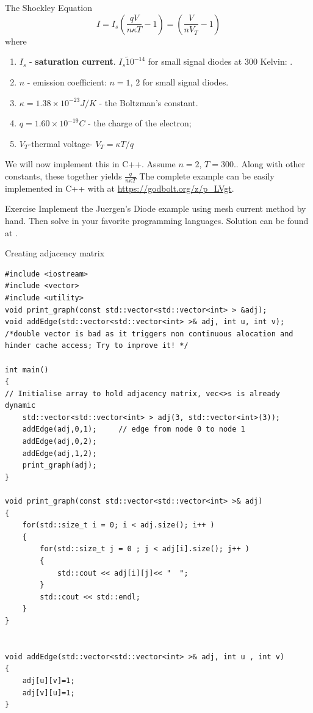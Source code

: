 \documentclass[xcolor=dvipsnames]{beamer}
\begin{document}
\begin{frame}{The Shockley Equation}
\[I=I_s\left(\frac{qV}{n\kappa T}-1\right)=\left(\frac{V}{nV_T}-1\right)\]
where
\begin{enumerate}
    \item $I_s$ - \textbf{saturation current}. $I_s\tilde 10^{-14}$ for small signal diodes at $300$ Kelvin: .
    \item $n$ - emission coefficient: $n=1,\,2$ for small signal diodes.
    \item $\kappa=1.38\times 10^{-23} J/K$ - the Boltzman's constant.
    \item $q=1.60\times 10^{-19}C$ - the charge of the electron;
    \item $V_T$-thermal voltage- $V_T=\kappa T/q$
\end{enumerate}
We will now implement this in C++. Assume $n=2$, $T=300.$. Along with other constants, these together yields $\frac{q}{n\kappa T}$ The complete example can be easily implemented in C++ with  \href{http://eigen.tuxfamily.org/index.php?title=Main_Page}{}
at \url{https://godbolt.org/z/p_LVgt}.

\end{frame}

\begin{frame}{Exercise}
	Implement the Juergen's Diode example using mesh current method by hand. Then solve in your favorite programming languages.
	Solution can be found at \href{https://github.com/leannejdong/Lachine-Est/blob/master/latex/soln-diode.pdf}{}.
\end{frame}

\begin{frame}[fragile,shrink=5]{Creating adjacency matrix}
\begin{verbatim}
#include <iostream>
#include <vector>
#include <utility>
void print_graph(const std::vector<std::vector<int> > &adj);
void addEdge(std::vector<std::vector<int> >& adj, int u, int v); 
/*double vector is bad as it triggers non continuous alocation and 
hinder cache access; Try to improve it! */

int main()
{
// Initialise array to hold adjacency matrix, vec<>s is already dynamic
    std::vector<std::vector<int> > adj(3, std::vector<int>(3));
    addEdge(adj,0,1);     // edge from node 0 to node 1
    addEdge(adj,0,2);
    addEdge(adj,1,2);
    print_graph(adj);
}

void print_graph(const std::vector<std::vector<int> >& adj)
{
    for(std::size_t i = 0; i < adj.size(); i++ )
    {
        for(std::size_t j = 0 ; j < adj[i].size(); j++ )
        {
            std::cout << adj[i][j]<< "  ";
        }
        std::cout << std::endl;
    }
}


void addEdge(std::vector<std::vector<int> >& adj, int u , int v)
{
    adj[u][v]=1;
    adj[v][u]=1;
}

\end{verbatim}	
\end{frame}
\end{document}
